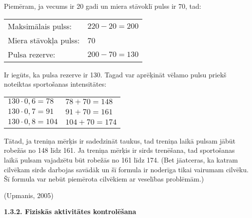 \documentclass[12pt]{article}
\begin{document}
Piemēram, ja vecums ir 20 gadi un miera stāvoklī pulss ir 70, tad:\par
\vspace{4pt}
\begin{tabular}{l|l}
    Maksimālais pulss: & $220-20=200$ \\
    Miera stāvokļa pulss: & 70\\
    Pulsa rezerve: & $200-70=130$\\
\end{tabular}\par
\vspace{4pt}
Ir iegūts, ka pulsa rezerve ir 130. Tagad var aprēķināt vēlamo pulsu priekš noteiktas sportošanas intensitātes:\par
\vspace{4pt}
\begin{tabular}{l|l}
    $130\cdot 0,6=78$ & $78+70=148$ \\
    $130\cdot 0,7=91$ & $91+70=161$ \\
    $130\cdot 0,8=104$ & $104+70=174$
\end{tabular}\par
\vspace{4pt}
Tātad, ja treniņa mērķis ir sadedzināt taukus, tad treniņa laikā pulsam jābūt robežās no 148 līdz 161. Ja treniņa mērķis ir sirds trenēšana, tad sportošanas laikā pulsam vajadzētu būt robežās no 161 līdz 174. (Bet jāatceras, ka katram cilvēkam sirds darbojas savādāk un šī formula ir noderīga tikai vairumam cilvēku. Šī formula var nebūt piemērota cilvēkiem ar veselības problēmām.)\par
(Upmanis, 2005)

\begin{center}
{\bf 1.3.2. Fiziskās aktivitātes kontrolēšana}
\end{center}
\end{document}
